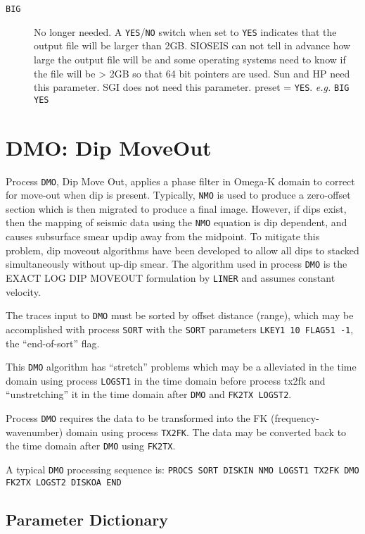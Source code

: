 \begin{description}
\item[\texttt{BIG}]  No longer needed.
         A \texttt{YES}/\texttt{NO} switch when set to \texttt{YES} indicates that the output
         file will be larger than 2GB.  SIOSEIS can not tell in
         advance how large the output file will be and some operating
         systems need to know if the file will be > 2GB so that
         64 bit pointers are used.  Sun and HP need this parameter.
         SGI does not need this parameter.
         \Gls{preset} = \texttt{YES}.    \textit{e.g.}  \texttt{BIG YES}
\end{description}

\section{DMO: Dip MoveOut}
\label{cmd_dmo}

Process \texttt{DMO}, Dip Move Out, applies a phase filter in Omega-K domain to
correct for move-out when dip is present.  Typically, \texttt{NMO} is used to
produce a zero-offset section which is then migrated to produce a final
image.  However, if dips exist, then the mapping of seismic data using
the \texttt{NMO} equation is dip dependent, and causes subsurface smear updip
away from the midpoint.  To mitigate this problem, dip moveout algorithms
have been developed to allow all dips to stacked simultaneously without
up-dip smear.  The algorithm used in process \texttt{DMO} is the EXACT LOG DIP
MOVEOUT formulation by \texttt{LINER} and assumes constant velocity.

The traces input to \texttt{DMO} must be sorted by offset distance (range), which
may be accomplished with process \texttt{SORT} with the \texttt{SORT} parameters \texttt{LKEY1 10 FLAG51 -1}, the ``end-of-sort'' flag.

This \texttt{DMO} algorithm has ``stretch'' problems which may be a alleviated in
the time domain using process \texttt{LOGST1} in the time domain before process
tx2fk and ``unstretching'' it in the time domain after \texttt{DMO} and \texttt{FK2TX LOGST2}.

Process \texttt{DMO} requires the data to be transformed into the FK (frequency-
wavenumber) domain using process \texttt{TX2FK}.  The data may be converted back to
the time domain after \texttt{DMO} using \texttt{FK2TX}.

A typical \texttt{DMO} processing sequence is:
\texttt{PROCS SORT DISKIN NMO LOGST1 TX2FK DMO FK2TX LOGST2 DISKOA END}

\subsection{Parameter Dictionary}

